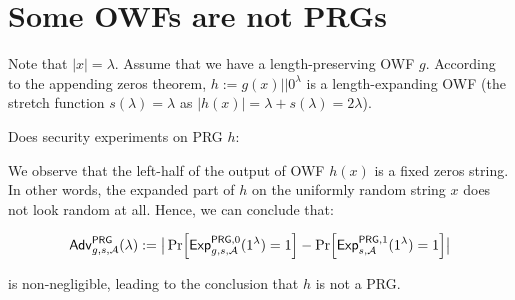 \section{Some OWFs are not PRGs}
Note that \(|x|=\lambda\).
Assume that we have a length-preserving OWF \(g\). According to the appending zeros theorem,
\(h:=g(x)||0^\lambda\) is a length-expanding OWF (the stretch function \(s(\lambda)
= \lambda\) as \(|h(x)|=\lambda + s(\lambda) = 2\lambda\)).

Does security experiments on PRG \(h\):
\begin{center}
    \begin{pchstack}
    \pchspace
    \end{pchstack}
\end{center}

We observe that the left-half of the output of OWF \(h(x)\) is a fixed zeros string.
In other words, the expanded part of \(h\) on the uniformly random string \(x\) does
not look random at all. Hence, we can conclude that:
\begin{center}
    \[ \mathsf{Adv}^{\mathsf{PRG}}_{g,s,\adv}(\lambda):=\big|\prob{{\mathsf{Exp}}_{g,s,\adv}^{\mathsf{PRG},0}(1^\lambda) = 1} 
   - \prob{{\mathsf{Exp}}_{s,\adv}^{\mathsf{PRG},1}(1^\lambda) = 1}\big| \]
\end{center}
is non-negligible, leading to the conclusion that \(h\) is not a PRG.